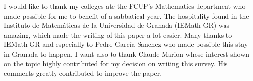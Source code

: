 I would like to thank my colleges ate the FCUP's Mathematics department who made possible for me to benefit of a sabbatical year. The hospitality found in the Instituto de Matemáticas de la Universidad de Granada (IEMath-GR) was amazing, which made the writing of this paper a lot easier. Many thanks to IEMath-GR and especially to Pedro García-Sanchez who made possible this stay in Granada to happen. I want also to thank Claude Marion whose interest shown on the topic highly contributed for my decision on writing this survey. His comments greatly contributed to improve the paper.
